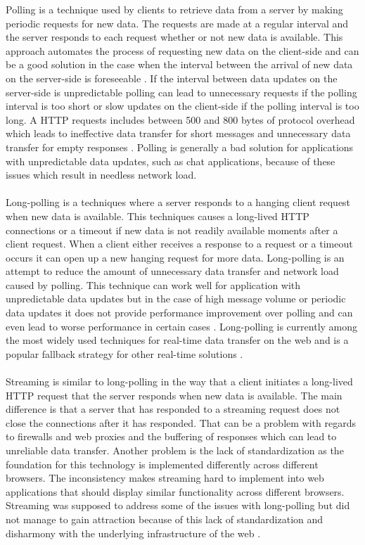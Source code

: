 Polling is a technique used by clients to retrieve data from a server by making periodic requests for new data. The requests are made at a regular interval and the server responds to each request whether or not new data is available. This approach automates the process of requesting new data on the client-side and can be a good solution in the case when the interval between the arrival of new data on the server-side is foreseeable \cite{pimentel2012communicating}. If the interval between data updates on the server-side is unpredictable polling can lead to unnecessary requests if the polling interval is too short or slow updates on the client-side if the polling interval is too long. A HTTP requests includes between 500 and 800 bytes of protocol overhead which leads to ineffective data transfer for short messages and unnecessary data transfer for empty responses \cite{grigorik2013high}. Polling is generally a bad solution for applications with unpredictable data updates, such as chat applications, because of these issues which result in needless network load.
\\ \\
Long-polling is a techniques where a server responds to a hanging client request when new data is available. This techniques causes a long-lived HTTP connections or a timeout if new data is not readily available moments after a client request. When a client either receives a response to a request or a timeout occurs it can open up a new hanging request for more data. Long-polling is an attempt to reduce the amount of unnecessary data transfer and network load caused by polling. This technique can work well for application with unpredictable data updates but in the case of high message volume or periodic data updates it does not provide performance improvement over polling and can even lead to worse performance in certain cases \cite{loreto2011known}. Long-polling is currently among the most widely used techniques for real-time data transfer on the web and is a popular fallback strategy for other real-time solutions \cite{modernizr}.
\\ \\
Streaming is similar to long-polling in the way that a client initiates a long-lived HTTP request that the server responds when new data is available. The main difference is that a server that has responded to a streaming request does not close the connections after it has responded. That can be a problem with regards to firewalls and web proxies and the buffering of responses which can lead to unreliable data transfer. Another problem is the lack of standardization as the foundation for this technology is implemented differently across different browsers. The inconsistency makes streaming hard to implement into web applications that should display similar functionality across different browsers. Streaming was supposed to address some of the issues with long-polling but did not manage to gain attraction because of this lack of standardization and disharmony with the underlying infrastructure of the web \cite{grigorik2013high}.
